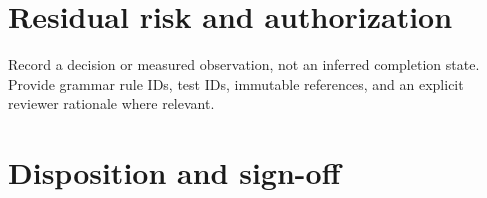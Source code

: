 \documentclass[11pt,letterpaper]{article}
\begin{document}
\section{Residual risk and authorization}
Record a decision or measured observation, not an inferred completion state. Provide grammar rule IDs, test IDs, immutable references, and an explicit reviewer rationale where relevant.
\section{Disposition and sign-off}
\end{document}
